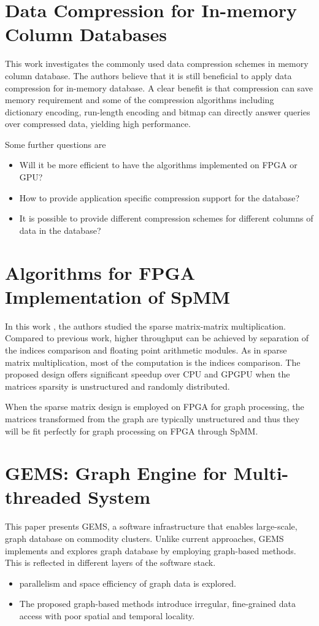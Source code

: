\section{Data Compression for In-memory Column Databases}
This work \cite{lin2016data} investigates the commonly used data compression schemes in memory
column database. The authors believe that it is still beneficial to apply data
compression for in-memory database. A clear benefit is that compression can save
memory requirement and some of the compression algorithms including dictionary
encoding, run-length encoding and bitmap can directly answer
queries over compressed data, yielding high performance.

Some further questions are
\begin{itemize}
    \item Will it be more efficient to have the algorithms implemented on FPGA or
        GPU?
    \item How to provide application specific compression support for the database?
    \item It is possible to provide different compression schemes for different
        columns of data in the database?
\end{itemize}

\section{Algorithms for FPGA Implementation of SpMM}
In this work \cite{jamro2015algorithms}, the authors studied the sparse matrix-matrix
multiplication. Compared to previous work, higher throughput can be achieved by
separation of the indices comparison and floating point arithmetic modules. As
in sparse matrix multiplication, most of the computation is the indices
comparison. The proposed design offers significant speedup over CPU and GPGPU
when the matrices sparsity is unstructured and randomly distributed. 

When the sparse matrix design is employed on FPGA for graph processing, the
matrices transformed from the graph are typically unstructured and thus they will be
fit perfectly for graph processing on FPGA through SpMM.

\section{GEMS: Graph Engine for Multi-threaded System}
This paper \cite{morari2015gems} presents GEMS, a software infrastructure that enables large-scale,
graph database on commodity clusters. Unlike current approaches, GEMS implements
and explores graph database by employing graph-based methods. This is
reflected in different layers of the software stack.
\begin{itemize}
    \item parallelism and space efficiency of graph data is explored.
    \item The proposed graph-based methods introduce irregular, fine-grained
        data access with poor spatial and temporal locality. 
\end{itemize}

